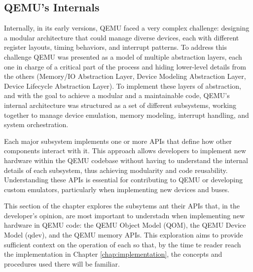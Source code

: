 \subsection{QEMU's Internals}
\label{chap:qemu_apis}

Internally, in its early versions, QEMU faced a very complex challenge: designing 
a modular architecture that could manage diverse devices, each with different 
register layouts, timing behaviors, and interrupt patterns. To address this 
challenge QEMU was presented as a model of multiple abstraction layers, each one in 
charge of a critical part of the process and hiding lower-level details from the others 
(Memory/IO Abstraction Layer, Device Modeling Abstraction Layer, Device Lifecycle 
Abstraction Layer). To implement these layers of abstraction, and with the goal 
to achieve a modular and a maintainable code, QEMU's internal architecture was 
structured as a set of different subsystems, working together to manage device 
emulation, memory modeling, interrupt handling, and system orchestration\cite{QemuInternalsDocumentation2026}.

Each major subsystem implements one or more APIs that define how other 
components interact with it. This approach allows developers to implement new 
hardware within the QEMU codebase without having to understand the internal 
details of each subsystem, thus achieving modularity and code reusability. 
Understanding these APIs is essential for contributing to QEMU or developing custom 
emulators, particularly when implementing new devices and buses\cite{QemuAPIDocumentation2026}.

This section of the chapter explores the subsytems ant their APIs that, in the 
developer's opinion, are most important to understadn when implementing new 
hardware in QEMU code: the QEMU Object Model (QOM), the QEMU Device 
Model (qdev), and the QEMU memory APIs. This exploration aims to provide sufficient context on 
the operation of each so that, by the time te reader reach 
the implementation in Chapter \ref{chap:implementation}, the concepts and procedures used there will be familiar.







%

%